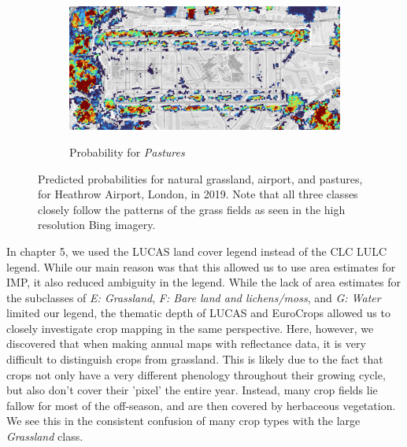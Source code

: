 \begin{figure}[H]
\begin{subfigure}[b]{0.6\textwidth}
            \label{fig:airport_natural_gras}
        \end{subfigure}
        \begin{subfigure}[b]{0.6\textwidth}
            \centering
            \caption{Probability for \textit{Pastures}}
            \includegraphics[width=\textwidth]{figs_06/airport_pastures.png}
            \label{fig:airport_natural_gras}
        \end{subfigure}
        \caption{Predicted probabilities for natural grassland, airport, and pastures, for Heathrow Airport, London, in 2019. Note that all three classes closely follow the patterns of the grass fields as seen in the high resolution Bing imagery.}
        \label{fig:airport_grass}
        \end{figure}

        In chapter 5, we used the LUCAS land cover legend instead of the CLC LULC legend. While our main reason was that this allowed us to use area estimates for IMP, it also reduced ambiguity in the legend. While the lack of area estimates for the subclasses of \textit{E: Grassland}, \textit{F: Bare land and lichens/moss}, and \textit{G: Water} limited our legend, the thematic depth of LUCAS and EuroCrops allowed us to closely investigate crop mapping in the same perspective. Here, however, we discovered that when making annual maps with reflectance data, it is very difficult to distinguish crops from grassland. This is likely due to the fact that crops not only have a very different phenology throughout their growing cycle, but also don't cover their 'pixel' the entire year. Instead, many crop fields lie fallow for most of the off-season, and are then covered by herbaceous vegetation. We see this in the consistent confusion of many crop types with the large \textit{Grassland} class.

            
